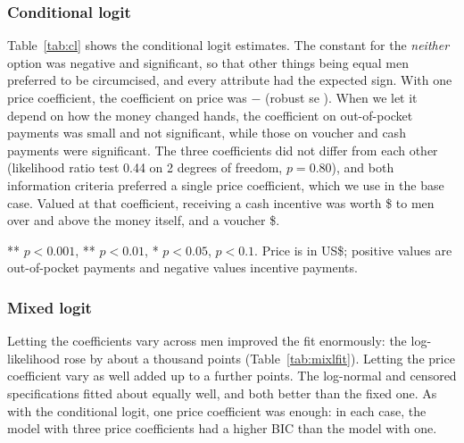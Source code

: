 \documentclass[11pt]{article}
\numberwithin{equation}{section}\numberwithin{figure}{section}\numberwithin{table}{section}
\begin{document}
\subsubsection{Conditional logit}
Table~\ref{tab:cl} shows the conditional logit estimates. The constant for the \emph{neither} option was negative and significant, so that other things being equal men preferred to be circumcised, and every attribute had the expected sign. With one price coefficient, the coefficient on price was $-$\mmclambda{} (robust se \mmclambdaSE). When we let it depend on how the money changed hands, the coefficient on out-of-pocket payments was small and not significant, while those on voucher and cash payments were significant. The three coefficients did not differ from each other (likelihood ratio test 0.44 on 2 degrees of freedom, $p = 0.80$), and both information criteria preferred a single price coefficient, which we use in the base case. Valued at that coefficient, receiving a cash incentive was worth \$\mmccashConst{} to men over and above the money itself, and a voucher \$\mmcvoucherConst.

\begin{table}[!htbp]
\centering
\caption{Conditional logit estimates, $\beta$ (robust se).}\label{tab:cl}
\small
\begin{threeparttable}

\begin{tablenotes}\footnotesize
\item *** $p < 0.001$, ** $p < 0.01$, * $p < 0.05$, \dag{} $p < 0.1$. Price is in US\$; positive values are out-of-pocket payments and negative values incentive payments.
\end{tablenotes}
\end{threeparttable}
\end{table}

\subsubsection{Mixed logit}
Letting the coefficients vary across men improved the fit enormously: the log-likelihood rose by about a thousand points (Table~\ref{tab:mixlfit}). Letting the price coefficient vary as well added up to a further \mmcMXgainPrice{} points. The log-normal and censored specifications fitted about equally well, and both better than the fixed one. As with the conditional logit, one price coefficient was enough: in each case, the model with three price coefficients had a higher BIC than the model with one.
\end{document}
